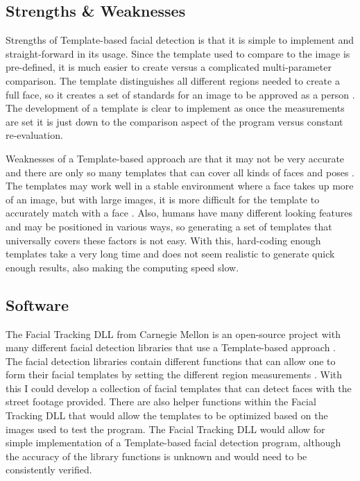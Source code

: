 \documentclass[onecolumn, draftclsnofoot,10pt, compsoc]{IEEEtran}
\begin{document}
\subsection{Strengths \& Weaknesses}
Strengths of Template-based facial detection is that it is simple to implement and straight-forward in its usage. Since the template used to compare to the image is pre-defined, it is much easier to create versus a complicated multi-parameter comparison. The template distinguishes all different regions needed to create a full face, so it creates a set of standards for an image to be approved as a person \cite{Study}. The development of a template is clear to implement as once the measurements are set it is just down to the comparison aspect of the program versus constant re-evaluation. 

Weaknesses of a Template-based approach are that it may not be very accurate and there are only so many templates that can cover all kinds of faces and poses \cite{Detection}. The templates may work well in a stable environment where a face takes up more of an image, but with large images, it is more difficult for the template to accurately match with a face \cite{Detection}. Also, humans have many different looking features and may be positioned in various ways, so generating a set of templates that universally covers these factors is not easy. With this, hard-coding enough templates take a very long time and does not seem realistic to generate quick enough results, also making the computing speed slow.

\subsection{Software}
The Facial Tracking DLL from Carnegie Mellon is an open-source project with many different facial detection libraries that use a Template-based approach \cite{Carnegie}. The facial detection libraries contain different functions that can allow one to form their facial templates by setting the different region measurements \cite{Carnegie}. With this I could develop a collection of facial templates that can detect faces with the street footage provided. There are also helper functions within the Facial Tracking DLL that would allow the templates to be optimized based on the images used to test the program. The Facial Tracking DLL would allow for simple implementation of a Template-based facial detection program, although the accuracy of the library functions is unknown and would need to be consistently verified. 
\end{document}
